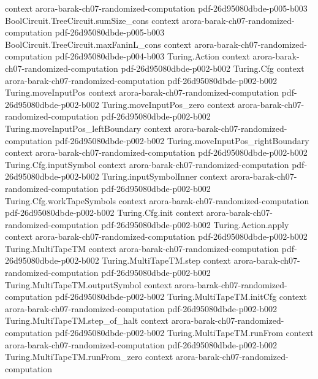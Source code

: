 \begin{theorem}
  {context}
  {arora-barak-ch07-randomized-computation}
  {pdf-26d95080dbde-p005-b003}
\proofstep
  {BoolCircuit.TreeCircuit.sumSize_cons}
  {context}
  {arora-barak-ch07-randomized-computation}
  {pdf-26d95080dbde-p005-b003}
\proofstep
  {BoolCircuit.TreeCircuit.maxFaninL_cons}
  {context}
  {arora-barak-ch07-randomized-computation}
  {pdf-26d95080dbde-p004-b003}
\proofstep
  {Turing.Action}
  {context}
  {arora-barak-ch07-randomized-computation}
  {pdf-26d95080dbde-p002-b002}
\proofstep
  {Turing.Cfg}
  {context}
  {arora-barak-ch07-randomized-computation}
  {pdf-26d95080dbde-p002-b002}
\proofstep
  {Turing.moveInputPos}
  {context}
  {arora-barak-ch07-randomized-computation}
  {pdf-26d95080dbde-p002-b002}
\proofstep
  {Turing.moveInputPos_zero}
  {context}
  {arora-barak-ch07-randomized-computation}
  {pdf-26d95080dbde-p002-b002}
\proofstep
  {Turing.moveInputPos_leftBoundary}
  {context}
  {arora-barak-ch07-randomized-computation}
  {pdf-26d95080dbde-p002-b002}
\proofstep
  {Turing.moveInputPos_rightBoundary}
  {context}
  {arora-barak-ch07-randomized-computation}
  {pdf-26d95080dbde-p002-b002}
\proofstep
  {Turing.Cfg.inputSymbol}
  {context}
  {arora-barak-ch07-randomized-computation}
  {pdf-26d95080dbde-p002-b002}
\proofstep
  {Turing.inputSymbolInner}
  {context}
  {arora-barak-ch07-randomized-computation}
  {pdf-26d95080dbde-p002-b002}
\proofstep
  {Turing.Cfg.workTapeSymbols}
  {context}
  {arora-barak-ch07-randomized-computation}
  {pdf-26d95080dbde-p002-b002}
\proofstep
  {Turing.Cfg.init}
  {context}
  {arora-barak-ch07-randomized-computation}
  {pdf-26d95080dbde-p002-b002}
\proofstep
  {Turing.Action.apply}
  {context}
  {arora-barak-ch07-randomized-computation}
  {pdf-26d95080dbde-p002-b002}
\proofstep
  {Turing.MultiTapeTM}
  {context}
  {arora-barak-ch07-randomized-computation}
  {pdf-26d95080dbde-p002-b002}
\proofstep
  {Turing.MultiTapeTM.step}
  {context}
  {arora-barak-ch07-randomized-computation}
  {pdf-26d95080dbde-p002-b002}
\proofstep
  {Turing.MultiTapeTM.outputSymbol}
  {context}
  {arora-barak-ch07-randomized-computation}
  {pdf-26d95080dbde-p002-b002}
\proofstep
  {Turing.MultiTapeTM.initCfg}
  {context}
  {arora-barak-ch07-randomized-computation}
  {pdf-26d95080dbde-p002-b002}
\proofstep
  {Turing.MultiTapeTM.step_of_halt}
  {context}
  {arora-barak-ch07-randomized-computation}
  {pdf-26d95080dbde-p002-b002}
\proofstep
  {Turing.MultiTapeTM.runFrom}
  {context}
  {arora-barak-ch07-randomized-computation}
  {pdf-26d95080dbde-p002-b002}
\proofstep
  {Turing.MultiTapeTM.runFrom_zero}
  {context}
  {arora-barak-ch07-randomized-computation}

\end{theorem}
